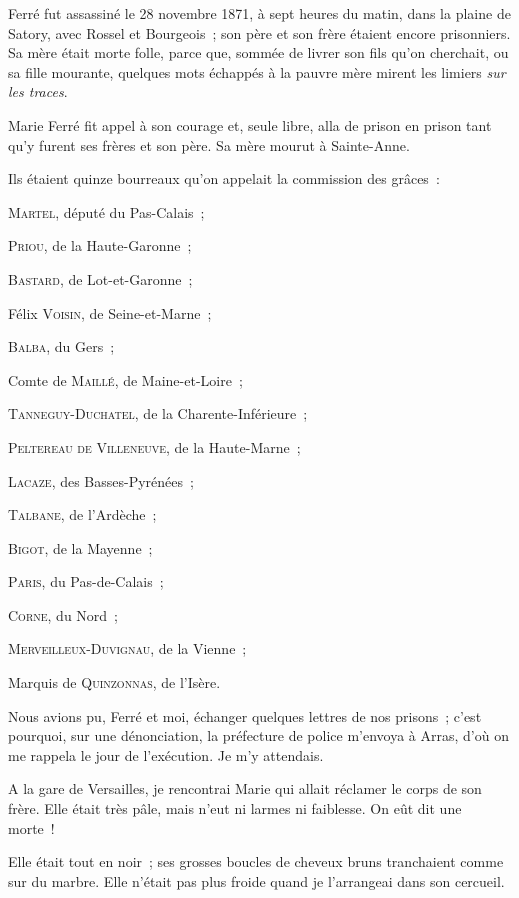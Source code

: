 \documentclass[french,twoside]{book} %
\begin{document}
\noindent Ferré fut assassiné le 28 novembre 1871, à sept heures du matin, dans la plaine de Satory, avec Rossel et Bourgeois ; son père et son frère étaient encore prisonniers. Sa mère était morte folle, parce que, sommée de livrer son fils qu’on cherchait, ou sa fille mourante, quelques mots échappés à la pauvre mère mirent les limiers \emph{sur les traces}.\par
Marie Ferré fit appel à son courage et, seule libre, alla de prison en prison tant qu’y furent ses frères et son père. Sa mère mourut à Sainte-Anne.\par
 Ils étaient quinze bourreaux qu’on appelait la commission des grâces :\par
M{\scshape artel}, député du Pas-Calais ;\par
P{\scshape riou}, de la Haute-Garonne ;\par
B{\scshape astard}, de Lot-et-Garonne ;\par
Félix V{\scshape oisin}, de Seine-et-Marne ;\par
B{\scshape alba}, du Gers ;\par
Comte de M{\scshape aillé}, de Maine-et-Loire ;\par
T{\scshape anneguy}-D{\scshape uchatel}, de la Charente-Inférieure ;\par
P{\scshape eltereau de} V{\scshape illeneuve}, de la Haute-Marne ;\par
L{\scshape acaze}, des Basses-Pyrénées ;\par
T{\scshape albane}, de l’Ardèche ;\par
B{\scshape igot}, de la Mayenne ;\par
P{\scshape aris}, du Pas-de-Calais ;\par
C{\scshape orne}, du Nord ;\par
M{\scshape erveilleux}-D{\scshape uvignau}, de la Vienne ;\par
Marquis de Q{\scshape uinzonnas}, de l’Isère.\par
Nous avions pu, Ferré et moi, échanger quelques lettres de nos prisons ; c’est pourquoi, sur une dénonciation, la préfecture de police m’envoya à Arras, d’où on me rappela le jour de l’exécution. Je m’y attendais.\par
A la gare de Versailles, je rencontrai Marie qui allait réclamer le corps de son frère. Elle était très pâle, mais n’eut ni larmes ni faiblesse. On eût dit une morte !\par
Elle était tout en noir ; ses grosses boucles de cheveux bruns tranchaient comme sur du marbre.  Elle n’était pas plus froide quand je l’arrangeai dans son cercueil.\par
\end{document}
